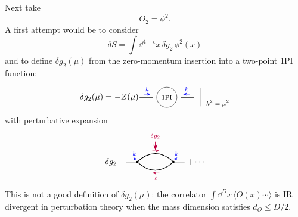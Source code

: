 Next take
\[
  O_2=\phi^2.
\]
A first attempt would be to consider
\[
  \delta S=\int \dd^{4-\epsilon}x\,\delta g_2\,\phi^2(x)
\]
and to define \(\delta g_2(\mu)\) from the zero-momentum insertion into a
two-point 1PI function:
\[
\begin{tikzpicture}[baseline=(base.base),>=Stealth,scale=0.85]
  \node (base) at (0,-0.15) {};
  \node at (-2.85,0) {\(\delta g_2(\mu)=-Z(\mu)\)};
  \draw[thick] (-1.35,0) -- (-0.7,0);
  \draw[thick] (0.7,0) -- (1.35,0);
  \node[circle,draw,minimum size=0.85cm,inner sep=1pt] at (0,0) {\scriptsize 1PI};
  \draw[->,blue] (-1.15,0.15) -- (-0.8,0.15) node[midway,above] {\scriptsize \(k\)};
  \draw[->,blue] (1.15,0.15) -- (0.8,0.15) node[midway,above] {\scriptsize \(k\)};
  \draw (1.65,-0.45) -- (1.65,0.45);
  \node[right] at (1.8,-0.3) {\scriptsize \(k^2=\mu^2\)};
\end{tikzpicture}
\]
with perturbative expansion
\[
\begin{tikzpicture}[baseline=(base.base),>=Stealth,scale=0.85]
  \node (base) at (0,-0.15) {};
  \node at (-2.2,0) {\(\delta g_2\)};
  \draw[thick] (-1.45,0) -- (-0.9,0);
  \draw[thick] (0.9,0) -- (1.45,0);
  \fill (-0.9,0) circle (1.5pt);
  \fill (0.9,0) circle (1.5pt);
  \draw[thick] (-0.9,0) .. controls (-0.3,0.55) and (0.3,0.55) .. (0.9,0);
  \draw[thick] (-0.9,0) .. controls (-0.3,-0.55) and (0.3,-0.55) .. (0.9,0);
  \draw[->,purple] (-0.15,0.55) -- (0.2,0.55) node[midway,above] {\scriptsize \(\ell\)};
  \draw[->,purple] (0.2,-0.55) -- (-0.15,-0.55) node[midway,below] {\scriptsize \(\ell\)};
  \draw[->,blue] (1.2,0.15) -- (0.9,0.15) node[midway,above] {\scriptsize \(k\)};
  \draw[->,blue] (-1.2,0.15) -- (-0.9,0.15) node[midway,above] {\scriptsize \(k\)};
  \draw[purple,->,thick] (0,1.0) -- (0,0.58);
  \node[purple,above] at (0,1.0) {\scriptsize \(\delta g_2\)};
  \node at (2.0,0) {\(+\cdots\)};
\end{tikzpicture}
\]
This is not a good definition of \(\delta g_2(\mu)\): the correlator
\(\int \dd^D x\,\langle O(x)\cdots\rangle\) is IR divergent in perturbation
theory when the mass dimension satisfies \(d_O\le D/2\).

